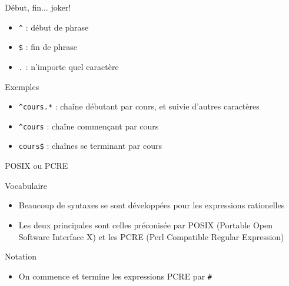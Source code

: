 \begin{frame}[containsverbatim]{\ftitle}
\def\blocktitle{Début, fin... joker!}
\begin{block}{\blocktitle}
\begin{itemize}
\item \verb!^! : début de phrase
\item \verb!$! : fin de phrase %
\item \verb!.! : n'importe quel caractère
\end{itemize}
\end{block}

\def\blocktitle{Exemples}
\begin{block}{\blocktitle}
\begin{itemize}
\item \verb!^cours.*! : chaîne débutant par cours, et suivie d'autres caractères
\item \verb!^cours! : chaîne commençant par cours
\item \verb!cours$! : chaînes se terminant par cours %
\end{itemize}
\end{block}
\end{frame}


\def\ftitle{POSIX ou PCRE}
\begin{frame}[containsverbatim]{\ftitle}
\def\blocktitle{Vocabulaire}
\begin{block}{\blocktitle}
\begin{itemize}
\item Beaucoup de syntaxes se sont développées pour les expressions rationelles
\item Les deux principales sont celles préconisée par POSIX (Portable Open Software Interface X) et les PCRE (Perl Compatible Regular Expression)
\end{itemize}
\end{block}

\def\blocktitle{Notation}
\begin{block}{\blocktitle}
\begin{itemize}
\item On commence et termine les expressions PCRE par \verb!#!
\end{itemize}
\end{block}
\end{frame}

